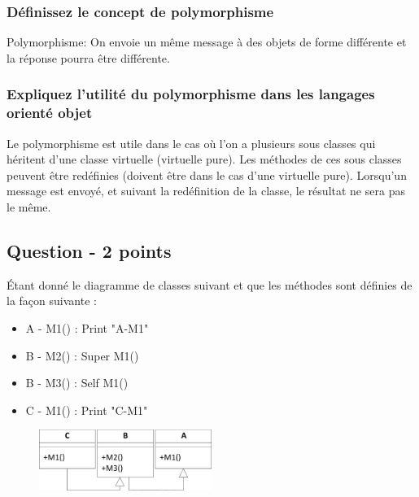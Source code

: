 \subsubsection{Définissez le concept de polymorphisme}
\textcolor[rgb]{0,0.48,0.58}{Polymorphisme: On envoie un même message à des objets de forme différente et la réponse pourra être différente.}



\subsubsection{Expliquez l'utilité du polymorphisme dans les langages orienté objet}
\textcolor[rgb]{0,0.48,0.58}{Le polymorphisme est utile dans le cas où l'on a plusieurs sous classes qui héritent d'une classe virtuelle (virtuelle pure). Les méthodes de ces sous classes peuvent être redéfinies (doivent être dans le cas d'une virtuelle pure). Lorsqu'un message est envoyé, et suivant la redéfinition de la classe, le résultat ne sera pas le même.}



\subsection{Question - 2 points}
Étant donné le diagramme de classes suivant et que les méthodes sont définies de la façon suivante :
\begin{itemize}
	\item A - M1() : Print "A-M1"
	\item B - M2() : Super M1()
    \item B - M3() : Self M1()
	\item C - M1() : Print "C-M1"
\end{itemize}
\begin{figure}[h]
	\centering
		\includegraphics[width=0.50\textwidth]{questions-reponses/2.oop/DiaDeClasse0.pdf}
	\label{fig:DiaDeClasse0}
\end{figure}



